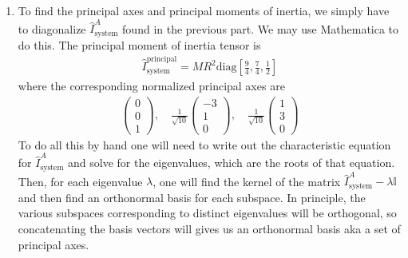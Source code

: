 \documentclass{article}
\theoremstyle{definition}
\newcommand{\f}[2]{\frac{#1}{#2}}
\newcommand{\lb}{\left[}
\newcommand{\rb}{\right]}
\begin{document}
\begin{enumerate}[label=(\alph*)]
	
	\item To find the principal axes and principal moments of inertia, we simply have to diagonalize $\hat I^A_\text{system}$ found in the previous part. We may use Mathematica to do this. The principal moment of inertia tensor is  
	\begin{align*}
	\boxed{\hat I_\text{system}^\text{principal} = MR^2 \text{diag}\lb \f{9}{4}, \f{7}{4}, \f{1}{2} \rb}
	\end{align*}
	where the corresponding normalized principal axes are
	\begin{align*}
	\boxed{\begin{pmatrix}
	0 \\ 0 \\ 1
	\end{pmatrix}, \quad \f{1}{\sqrt{10}}\begin{pmatrix}
	-3 \\ 1 \\ 0
	\end{pmatrix}, \quad 
	\f{1}{\sqrt{10}}\begin{pmatrix}
	1 \\ 3 \\ 0
	\end{pmatrix}}
	\end{align*}
	To do all this by hand one will need to write out the characteristic equation for $\hat{I}^A_\text{system}$ and solve for the eigenvalues, which are the roots of that equation. Then, for each eigenvalue $\lambda$, one will find the kernel of the matrix $\hat{I}^A_\text{system} - \lambda \mathbb{I}$ and then find an orthonormal basis for each subspace. In principle, the various subspaces corresponding to distinct eigenvalues will be orthogonal, so concatenating the basis vectors will gives us an orthonormal basis aka a set of principal axes. 
	

\end{enumerate}
\end{document}
